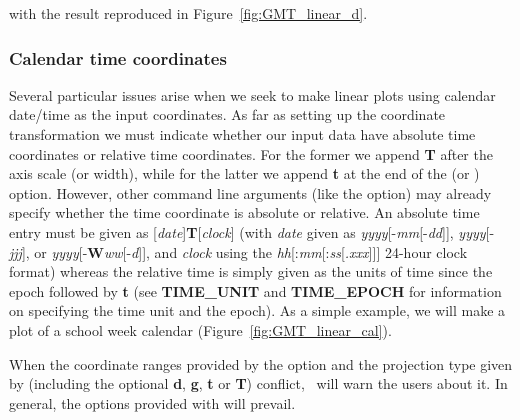 
\noindent
with the result reproduced in Figure~\ref{fig:GMT_linear_d}.

\subsubsection{Calendar time coordinates}
\label{sec:time}


Several particular issues arise when we seek to make linear plots using calendar date/time as
the input coordinates.  As far as setting up the coordinate transformation we must indicate whether
our input data have absolute time coordinates or relative time coordinates.  For the
former we append \textbf{T} after the axis scale (or width), while for the latter we append \textbf{t} at the
end of the  (or ) option.
However, other command line arguments (like the  option) may already specify whether the time
coordinate is absolute or relative. An
absolute time entry must be given as [{\it date}]\textbf{T}[{\it clock}]
(with {\it date} given as {\it yyyy}[-{\it mm}[-{\it dd}]], {\it yyyy}[-{\it jjj}], or {\it yyyy}[-\textbf{W}{\it ww}[-{\it d}]], and {\it clock} using
the {\it hh}[:{\it mm}[:{\it ss}[{\it .xxx}]]] 24-hour clock format) whereas the relative time is simply
given as the units of time since the epoch followed by \textbf{t} (see \textbf{TIME\_UNIT} and \textbf{TIME\_EPOCH} for information
on specifying the time unit and the epoch).  As a simple example, we will make a plot of a school week
calendar (Figure~\ref{fig:GMT_linear_cal}).


When the coordinate ranges provided by the  option and the projection type given by 
(including the optional \textbf{d}, \textbf{g}, \textbf{t} or \textbf{T}) conflict, \GMT\ will warn the
users about it. In general, the options provided with  will prevail.



